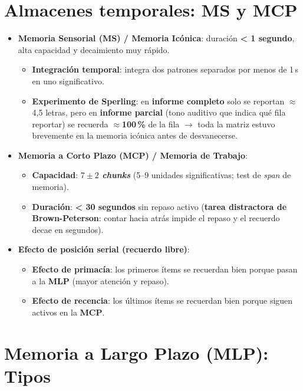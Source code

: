 \documentclass[11pt,a4paper]{article}
\begin{document}
\section{Almacenes temporales: MS y MCP}

\begin{itemize}
  \item \textbf{Memoria Sensorial (MS) / Memoria Icónica}: duración \textbf{< 1 segundo}, alta capacidad y decaimiento muy rápido.
  \begin{itemize}
    \item \textbf{Integración temporal}: integra dos patrones separados por menos de 1\,s en uno significativo.
    \item \textbf{Experimento de Sperling}: en \textbf{informe completo} solo se reportan $\approx$4,5 letras, pero en \textbf{informe parcial} (tono auditivo que indica qué fila reportar) se recuerda \textbf{$\approx$100\,\%} de la fila $\rightarrow$ toda la matriz estuvo brevemente en la memoria icónica antes de desvanecerse.
  \end{itemize}
  \item \textbf{Memoria a Corto Plazo (MCP) / Memoria de Trabajo}:
  \begin{itemize}
    \item \textbf{Capacidad}: \textbf{$7 \pm 2$ \textit{chunks}} (5--9 unidades significativas; test de \textit{span} de memoria).
    \item \textbf{Duración}: \textbf{< 30 segundos} sin repaso activo (\textbf{tarea distractora de Brown-Peterson}: contar hacia atrás impide el repaso y el recuerdo decae en segundos).
  \end{itemize}
  \item \textbf{Efecto de posición serial (recuerdo libre)}:
  \begin{itemize}
    \item \textbf{Efecto de primacía}: los primeros ítems se recuerdan bien porque pasan a la \textbf{MLP} (mayor atención y repaso).
    \item \textbf{Efecto de recencia}: los últimos ítems se recuerdan bien porque siguen activos en la \textbf{MCP}.
  \end{itemize}
\end{itemize}

\section{Memoria a Largo Plazo (MLP): Tipos}
\end{document}
